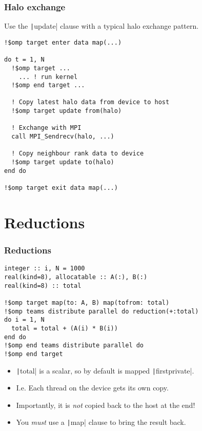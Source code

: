 \documentclass{beamer}
\begin{document}
\begin{frame}[fragile]
\frametitle{Halo exchange}
Use the \texttt|update| clause with a typical halo exchange pattern.

\begin{verbatim}
!$omp target enter data map(...)

do t = 1, N
  !$omp target ...
    ... ! run kernel
  !$omp end target ...

  ! Copy latest halo data from device to host
  !$omp target update from(halo)

  ! Exchange with MPI
  call MPI_Sendrecv(halo, ...)

  ! Copy neighbour rank data to device
  !$omp target update to(halo)
end do

!$omp target exit data map(...)
\end{verbatim}

\end{frame}

\section{Reductions}
\begin{frame}[fragile]
\frametitle{Reductions}
\begin{verbatim}
integer :: i, N = 1000
real(kind=8), allocatable :: A(:), B(:)
real(kind=8) :: total

!$omp target map(to: A, B) map(tofrom: total)
!$omp teams distribute parallel do reduction(+:total)
do i = 1, N
  total = total + (A(i) * B(i))
end do
!$omp end teams distribute parallel do
!$omp end target
\end{verbatim}

\begin{itemize}
  \item \texttt|total| is a scalar, so by default is mapped \texttt|firstprivate|.
  \item I.e. Each thread on the device gets its own copy.
  \item Importantly, it is \emph{not} copied back to the host at the end!
  \item You \emph{must} use a \texttt|map| clause to bring the result back.
\end{itemize}

\end{frame}
\end{document}
